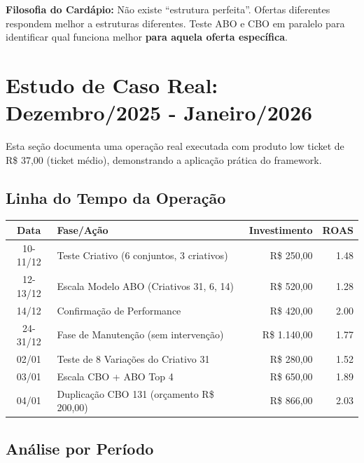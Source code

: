 \documentclass[12pt, a4paper]{article}
\newcommand{\reais}[1]{R\$ #1}
\begin{document}
\textcolor{primaryColor}{\textbf{Filosofia do Cardápio:}} Não existe ``estrutura perfeita''. Ofertas diferentes respondem melhor a estruturas diferentes. Teste ABO e CBO em paralelo para identificar qual funciona melhor \textbf{para aquela oferta específica}.

\section{Estudo de Caso Real: Dezembro/2025 - Janeiro/2026}

Esta seção documenta uma operação real executada com produto low ticket de \reais{37,00} (ticket médio), demonstrando a aplicação prática do framework.

\subsection{Linha do Tempo da Operação}

\begin{table}[H]
    \centering
    \footnotesize
    \renewcommand{\arraystretch}{1.3}
    \begin{tabularx}{\textwidth}{c X r r}
        \toprule
        \rowcolor{tableHeader} \textbf{Data} & \textbf{Fase/Ação} & \textbf{Investimento} & \textbf{ROAS} \\
        \midrule
        10-11/12 & Teste Criativo (6 conjuntos, 3 criativos) & \reais{250,00} & 1.48 \\
        \rowcolor{lightGray}
        12-13/12 & Escala Modelo ABO (Criativos 31, 6, 14) & \reais{520,00} & 1.28 \\
        14/12 & Confirmação de Performance & \reais{420,00} & 2.00 \\
        \rowcolor{lightGray}
        24-31/12 & Fase de Manutenção (sem intervenção) & \reais{1.140,00} & 1.77 \\
        02/01 & Teste de 8 Variações do Criativo 31 & \reais{280,00} & 1.52 \\
        \rowcolor{lightGray}
        03/01 & Escala CBO + ABO Top 4 & \reais{650,00} & 1.89 \\
        04/01 & Duplicação CBO 131 (orçamento \reais{200,00}) & \reais{866,00} & 2.03 \\
        \bottomrule
    \end{tabularx}
\end{table}

\subsection{Análise por Período}
\end{document}
